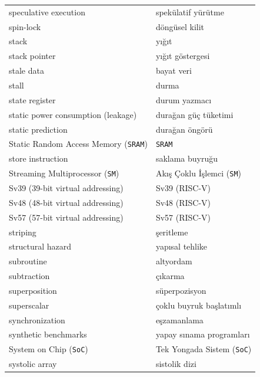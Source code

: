 {\begin{longtable}{@{}p{7.6cm}p{7.6cm}@{}}
speculative execution & spekülatif yürütme \\
spin-lock & döngüsel kilit \\
stack & yığıt \\
stack pointer & yığıt göstergesi \\
stale data & bayat veri \\
stall & durma \\
state register & durum yazmacı \\
static power consumption (leakage) & durağan güç tüketimi \\
static prediction & durağan öngörü \\
Static Random Access Memory (\texttt{SRAM}) & \texttt{SRAM} \\
store instruction & saklama buyruğu \\
Streaming Multiprocessor (\texttt{SM}) & Akış Çoklu İşlemci (\texttt{SM}) \\
Sv39 (39-bit virtual addressing) & Sv39 (RISC-V) \\
Sv48 (48-bit virtual addressing) & Sv48 (RISC-V) \\
Sv57 (57-bit virtual addressing) & Sv57 (RISC-V) \\
striping & şeritleme \\
structural hazard & yapısal tehlike \\
subroutine & altyordam \\
subtraction & çıkarma \\
superposition & süperpozisyon \\
superscalar & çoklu buyruk başlatımlı \\
synchronization & eşzamanlama \\
synthetic benchmarks & yapay sınama programları \\
System on Chip (\texttt{SoC}) & Tek Yongada Sistem (\texttt{SoC}) \\
systolic array & sistolik dizi \\


\end{longtable}}
